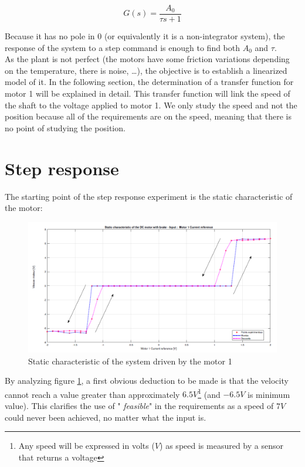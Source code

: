 \begin{equation}
    G(s) = \frac{A_0}{\tau s + 1}
    \label{eq:1_st_order_TF}
\end{equation}

Because it has no pole in $0$ (or equivalently it is a non-integrator system), the response of the system to a step
command is enough to find both $A_0$ and $\tau$.\\

As the plant is not perfect (the motors have some friction variations depending on the temperature, there is noise, 
\dots), the objective is to establish a linearized model of it. In the following section, the determination of a
transfer function for motor 1 will be explained in detail. This transfer function will link the speed of the shaft to
the voltage applied to motor 1. We only study the speed and not the position because all of the requirements are on
the speed, meaning that there is no point of studying the position.

\section{Step response}

The starting point of the step response experiment is the static characteristic of the motor:

\begin{figure}[H]
    \centering
    \includegraphics[height=\textheight/4]{Pictures/static_characteristic_motor_1.png}
    \caption{Static characteristic of the system driven by the motor 1}
    \label{fig:static_characteristic_motor_1}
\end{figure}

By analyzing figure \ref{fig:static_characteristic_motor_1}, a first obvious deduction to be made is that the velocity
cannot reach a value greater than approximately $6.5 V$\footnote{Any speed will be expressed in volts ($V$) as speed is
measured by a sensor that returns a voltage} (and $-6.5 V$ is minimum value). This clarifies the use of "\textit{
feasible}" in the requirements as a speed of $7 V$ could never been achieved, no matter what the input is.\\

